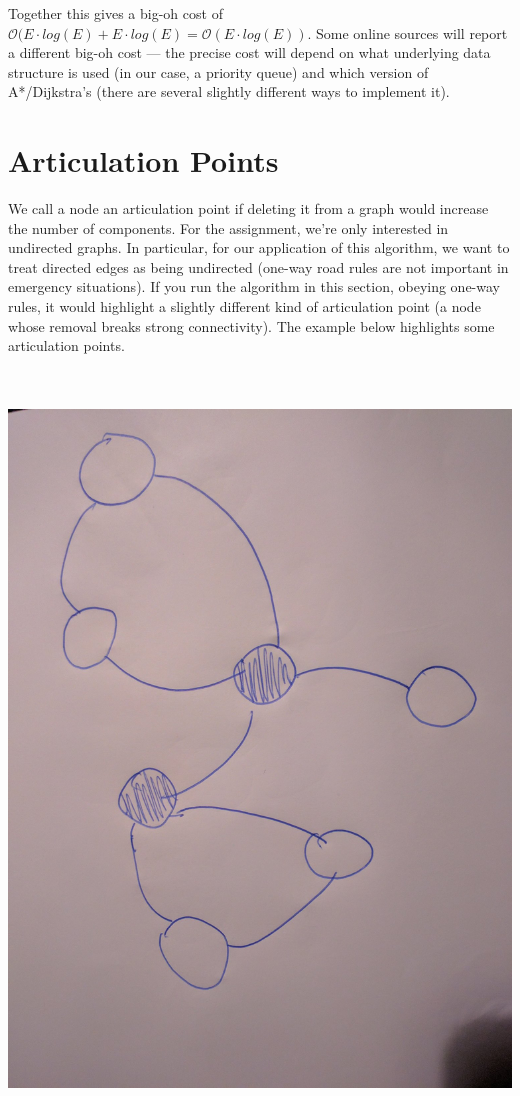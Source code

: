 \documentclass[a4paper,12pt]{article}
\begin{document}
Together this gives a big-oh cost of $\mathcal{O}(E \cdot log(E) + E \cdot log(E) = \mathcal{O}(E \cdot log(E))$. Some online sources will report a different big-oh cost --- the precise cost will depend on what underlying data structure is used (in our case, a priority queue) and which version of A*/Dijkstra's (there are several slightly different ways to implement it).


\section{Articulation Points}

We call a node an articulation point if deleting it from a graph would increase the number of components. For the assignment, we're only interested in undirected graphs. In particular, for our application of this algorithm, we want to treat directed edges as being undirected (one-way road rules are not important in emergency situations). If you run the algorithm in this section, obeying one-way rules, it would highlight a slightly different kind of articulation point (a node whose removal breaks strong connectivity). The example below highlights some articulation points.

~\\~\\
\includegraphics[scale=0.1]{fig_artpts}
~\\~\\
\end{document}
